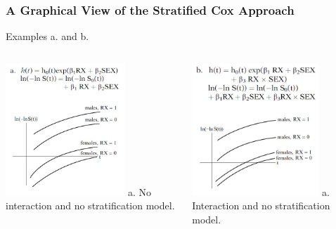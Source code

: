 \documentclass{beamer}
\theoremstyle{definition}
\begin{document}
\begin{frame}
\frametitle{A Graphical View of the Stratified Cox Approach}
\begin{block}{Examples a. and b.}
\begin{columns}
    \begin{column}{0.48\textwidth}
        \includegraphics[width =\textwidth, height=5cm]{CH5_G1.JPG}
        a. No interaction and no stratification model. 
    \end{column}
    \hspace{-10pt}
    \begin{column}{0.48\textwidth}
         \includegraphics[width =\textwidth, height=5cm]{CH5_G2.JPG}
         a. Interaction and no stratification model. 
    \end{column}
\end{columns}
\end{block}
\end{frame}
\end{document}
